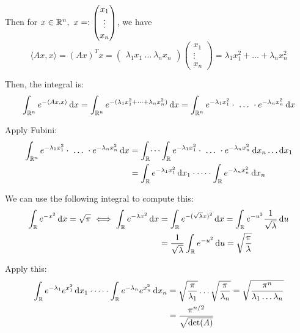 \documentclass[12pt]{article}
\begin{document}
Then for $x \in \mathbb{R}^n,\ x =: \begin{pmatrix} x_1 \\ \vdots \\ x_n \end{pmatrix}$, we have
$$
    \langle Ax, x \rangle = (Ax)^T x = \begin{pmatrix} \lambda_1x_1\ \dots\ \lambda_nx_n \end{pmatrix} \begin{pmatrix} x_1 \\ \vdots \\ x_n \end{pmatrix} = \lambda_1x_1^2 + \dots +\lambda_nx_n^2 
$$

Then, the integral is:
$$
\begin{aligned}
    \int_{\mathbb{R}^n} e^{-\langle Ax, x \rangle}\mathop{}\!\mathrm{d} x &= \int_{\mathbb{R}^n} e^{-(\lambda_1x_1^2 + \dots +\lambda_nx_n^2) }\mathop{}\!\mathrm{d} x = \int_{\mathbb{R}^n} e^{-\lambda_1x_1^2} \cdot\ \dots\ \cdot e^{-\lambda_nx_n^2 }\mathop{}\!\mathrm{d} x \\
\end{aligned}
$$

Apply Fubini:
$$
\begin{aligned}
    \int_{\mathbb{R}^n} e^{-\lambda_1x_1^2} \cdot\ \dots\ \cdot e^{-\lambda_nx_n^2 }\mathop{}\!\mathrm{d} x &= \int_{\mathbb{R}} \dots \int_{\mathbb{R}} e^{-\lambda_1x_1^2} \cdot\ \dots\ \cdot e^{-\lambda_nx_n^2 } \mathop{}\!\mathrm{d} x_n \dots \mathop{}\!\mathrm{d} x_1 \\
    &= \int_{\mathbb{R}} e^{-\lambda_1x_1^2} \mathop{}\!\mathrm{d} x_1 \cdot \dots \cdot \int_{\mathbb{R}} e^{-\lambda_nx_n^2} \mathop{}\!\mathrm{d} x_n \\
\end{aligned}
$$


We can use the following integral to compute this:
$$
\begin{aligned}
    \int_{\mathbb{R}} e^{-x^2} \mathop{}\!\mathrm{d} x = \sqrt{\pi} \iff \int_{\mathbb{R}} e^{-\lambda x^2} \mathop{}\!\mathrm{d} x &= \int_{\mathbb{R}} e^{-(\sqrt{\lambda}x)^2} \mathop{}\!\mathrm{d} x = \int_{\mathbb{R}} e^{-u^2} \frac{1}{\sqrt{\lambda}} \mathop{}\!\mathrm{d} u \\
    &= \frac{1}{\sqrt{\lambda}} \int_{\mathbb{R}} e^{-u^2} \mathop{}\!\mathrm{d} u = \sqrt{\frac{\pi}{\lambda}}
\end{aligned}
$$

Apply this:
$$
\begin{aligned}
    \int_{\mathbb{R}} e^{-\lambda_1}e^{x_1^2} \mathop{}\!\mathrm{d} x_1 \cdot \dots \cdot \int_{\mathbb{R}} e^{-\lambda_n}e^{x_n^2} \mathop{}\!\mathrm{d} x_n &= \sqrt{\frac{\pi}{\lambda_1}} \dots \sqrt{\frac{\pi}{\lambda_n}} = \sqrt{\frac{\pi^n}{\lambda_1 \dots \lambda_n}} \\
    &= \frac{\pi^{n/2}}{\sqrt{\det(A)}}
\end{aligned}
$$
\end{document}
